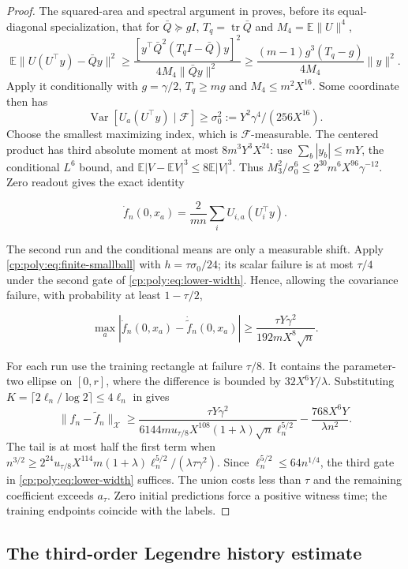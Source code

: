 \begin{proof}
The squared-area and spectral argument in 
proves, before its equal-diagonal specialization, that for
$\bar Q\succeq gI$, $T_q=\operatorname{tr}\bar Q$ and
$M_4=\mathbb E\|U\|^4$,
\[
\mathbb E\|U(U^\top y)-\bar Qy\|^2
 \ge\frac{[y^\top\bar Q^2(T_qI-\bar Q)y]^2}
 {4M_4\|\bar Qy\|^2}
 \ge\frac{(m-1)g^3(T_q-g)}{4M_4}\|y\|^2.
\]
Apply it conditionally with $g=\gamma/2$, $T_q\ge mg$ and
$M_4\le m^2X^{16}$. Some coordinate then has
\[
\operatorname{Var}[U_a(U^\top y)\mid\mathcal F]
 \ge\sigma_0^2:=Y^2\gamma^4/(256X^{16}).
\]
Choose the smallest maximizing index, which is $\mathcal F$-measurable.
The centered product has third absolute moment at most
$8m^3Y^3X^{24}$: use $\sum_b|y_b|\le mY$, the conditional $L^6$
bound, and $\mathbb E|V-\mathbb EV|^3\le8\mathbb E|V|^3$.
Thus $M_3^2/\sigma_0^6\le2^{30}m^6X^{96}\gamma^{-12}$.
Zero readout gives the exact identity

\[
\dot f_n(0,x_a)=\frac2{mn}\sum_iU_{i,a}(U_i^\top y).
\]

The second run and the conditional means are only a measurable shift.
Apply \eqref{cp:poly:eq:finite-smallball} with
$h=\tau\sigma_0/24$; its scalar failure is at most $\tau/4$ under
the second gate of \eqref{cp:poly:eq:lower-width}. Hence, allowing
the covariance failure, with probability at least $1-\tau/2$,

\[
\max_a|\dot f_n(0,x_a)-\dot{\widetilde f}_n(0,x_a)|
 \ge\frac{\tau Y\gamma^2}{192mX^8\sqrt n}.
\]

For each run use the training rectangle at failure $\tau/8$.
It contains the parameter-two ellipse on $[0,r]$, where the difference
is bounded by $32X^6Y/\lambda$. Substituting
$K=\lceil2\ell_n/\log2\rceil\le4\ell_n$ in
 gives
\[
\|f_n-\widetilde f_n\|_{\mathcal X}
 \ge\frac{\tau Y\gamma^2}
 {6144m u_{\tau/8}X^{108}(1+\lambda)\sqrt n\ell_n^{5/2}}
       -\frac{768X^6Y}{\lambda n^2}.
\]
The tail is at most half the first term when
$n^{3/2}\ge2^{24}u_{\tau/8}X^{114}
m(1+\lambda)\ell_n^{5/2}/(\lambda\tau\gamma^2)$.
Since $\ell_n^{5/2}\le64n^{1/4}$, the third gate in
\eqref{cp:poly:eq:lower-width} suffices.
The union costs less than $\tau$ and the remaining coefficient exceeds
$a_\tau$. Zero initial predictions force a positive witness time;
the training endpoints coincide with the labels.
\end{proof}

\subsection{The third-order Legendre history estimate}
\label{cp:poly:legendre-section}

